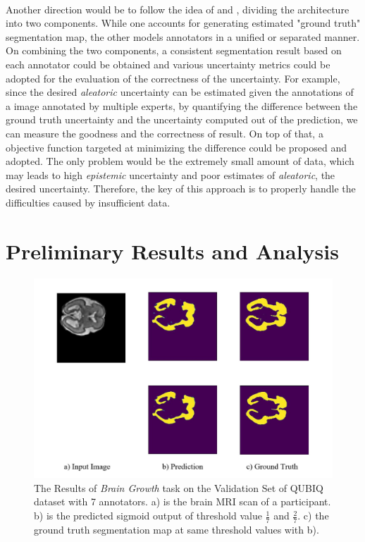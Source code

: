 \documentclass[12pt]{extarticle}
\begin{document}
\paragraph{}
Another direction would be to follow the idea of 
\cite{zhang2020disentangling} and \cite{kohl2019probabilistic}, 
dividing the architecture into two components. 
While one accounts for generating estimated "ground truth" segmentation map,
the other models annotators in a unified or separated manner. On combining 
the two components, a consistent segmentation result based on each annotator 
could be obtained and various uncertainty metrics could be adopted for
the evaluation of the correctness of the uncertainty. For example,
since the desired \textit{aleatoric} uncertainty can be 
estimated given the annotations of a image annotated by multiple experts\cite{qubiq}, 
by quantifying the difference between the ground truth uncertainty and 
the uncertainty computed out of the prediction, we can measure the goodness and the correctness of
result. On top of that, a objective function targeted at 
minimizing the difference could be proposed and adopted. The only problem would be the 
extremely small amount of data, which may leads to high \textit{epistemic} uncertainty and 
poor estimates of \textit{aleatoric}, the desired uncertainty. Therefore, the key of this approach 
is to properly handle the difficulties caused by insufficient data.

\section{Preliminary Results and Analysis}
\begin{figure}[hb!]
\centering
\includegraphics[scale=0.28]{fig1.jpg}
\caption{The Results of \textit{Brain Growth} task on the Validation Set of 
QUBIQ dataset with 7 annotators. a) is the brain 
MRI scan of a participant. b) is the predicted sigmoid output of threshold 
value $\frac{1}{7}$ and $\frac{2}{7}$. c) the 
ground truth segmentation map at same threshold values with b).}
\label{pre_results}
\end{figure}
\end{document}
